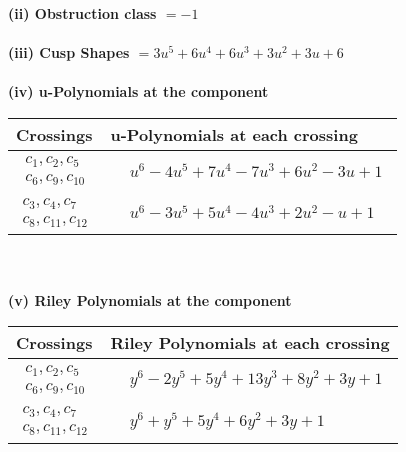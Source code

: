 \documentclass[1p]{elsarticle_modified}
\theoremstyle{definition}
\begin{document}
\flushleft \textbf{(ii) Obstruction class $= -1$}\\~\\
\flushleft \textbf{(iii) Cusp Shapes $= 3 u^5+6 u^4+6 u^3+3 u^2+3 u+6$}\\~\\
\newpage\renewcommand{\arraystretch}{1}
\flushleft \textbf{(iv) u-Polynomials at the component}\newline \\
\begin{tabular}{m{50pt}|m{274pt}}
Crossings & \hspace{64pt}u-Polynomials at each crossing \\
\hline $$\begin{aligned}c_{1},c_{2},c_{5}\\c_{6},c_{9},c_{10}\end{aligned}$$&$\begin{aligned}
&u^6-4 u^5+7 u^4-7 u^3+6 u^2-3 u+1
\end{aligned}$\\
\hline $$\begin{aligned}c_{3},c_{4},c_{7}\\c_{8},c_{11},c_{12}\end{aligned}$$&$\begin{aligned}
&u^6-3 u^5+5 u^4-4 u^3+2 u^2- u+1
\end{aligned}$\\
\hline
\end{tabular}\\~\\
\newpage\renewcommand{\arraystretch}{1}
\flushleft \textbf{(v) Riley Polynomials at the component}\newline \\
\begin{tabular}{m{50pt}|m{274pt}}
Crossings & \hspace{64pt}Riley Polynomials at each crossing \\
\hline $$\begin{aligned}c_{1},c_{2},c_{5}\\c_{6},c_{9},c_{10}\end{aligned}$$&$\begin{aligned}
&y^6-2 y^5+5 y^4+13 y^3+8 y^2+3 y+1
\end{aligned}$\\
\hline $$\begin{aligned}c_{3},c_{4},c_{7}\\c_{8},c_{11},c_{12}\end{aligned}$$&$\begin{aligned}
&y^6+y^5+5 y^4+6 y^2+3 y+1
\end{aligned}$\\
\hline
\end{tabular}\\~\\
\end{document}
